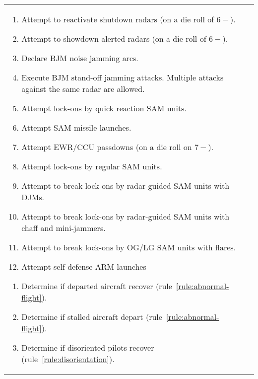 \begin{twocolumntablefloat}
\begin{twocolumntable}
\begin{tabularx}{1.0\linewidth}{L@{\hspace{\columnsep}}L}
{\begin{enumerate}[topsep=0pt]
\begin{enumerate}[nosep]
    \item Attempt to reactivate shutdown radars (on a die roll of $6-$).
    \item Attempt to showdown alerted radars (on a die roll of $6-$).
    \item Declare BJM noise jamming arcs.
    \item Execute BJM stand-off jamming attacks. Multiple attacks against the same radar are allowed.
    \item Attempt lock-ons by quick reaction SAM units.
    \item Attempt SAM missile launches.
    \item Attempt EWR/CCU passdowns (on a die roll on $7-$).
    \item Attempt lock-ons by regular SAM units.
    \item Attempt to break lock-ons by radar-guided SAM units with DJMs.
    \item Attempt to break lock-ons by radar-guided SAM units with chaff and mini-jammers.
    \item Attempt to break lock-ons by OG/LG SAM units with flares.
    \item Attempt self-defense ARM launches
\end{enumerate}


\begin{enumerate}[nosep]
    \item Determine if departed aircraft recover (rule~\ref{rule:abnormal-flight}).
    \item Determine if stalled aircraft depart (rule~\ref{rule:abnormal-flight}).
    \item Determine if disoriented pilots recover (rule~\ref{rule:disorientation}).
\end{enumerate}



\end{enumerate}}
\end{tabularx}
\end{twocolumntable}
\end{twocolumntablefloat}
